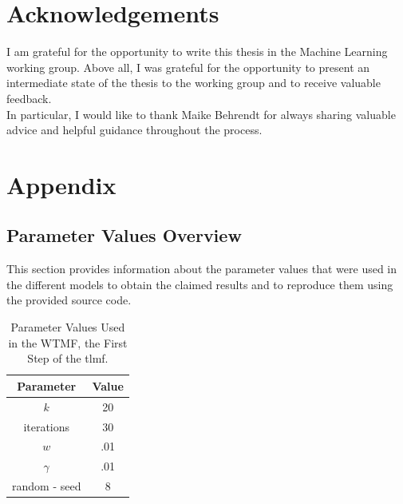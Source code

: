 \section{Acknowledgements}
I am grateful for the opportunity to write this thesis in the Machine Learning working group. Above all, I was grateful for the opportunity to present an intermediate state of the thesis to the working group and to receive valuable feedback.\\
In particular, I would like to thank Maike Behrendt for always sharing valuable advice and helpful guidance throughout the process. 

\clearpage
\section{Appendix}
\label{sec:appendix}
\subsection{Parameter Values Overview}
\label{chap:pvo}
This section provides information about the parameter values that were used in the different models to obtain the claimed results and to reproduce them using the provided source code.

\begin{table}[h!]
    \centering
    \begin{tabular}{|c|c|}
        \hline Parameter & Value \\
        \hline  $k$ & 20 \\
        iterations & 30 \\
        $w$ & .01 \\
        $\gamma$ & .01 \\
        random - seed & 8 \\
    \hline    
    \end{tabular}
    \caption{Parameter Values Used in the WTMF, the First Step of the \acrshort{tlmf}.}
    \label{tab:wtmf}
\end{table}

